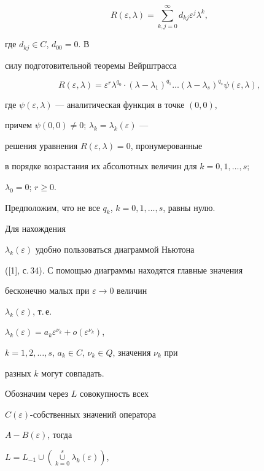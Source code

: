 $$


R(\varepsilon, \lambda )=\sum_{k,j=0}^\infty


d_{kj}\varepsilon^j\lambda^k,


$$


где $d_{kj}\in C$, $d_{00}=0$. В


силу подготовительной теоремы Вейрштрасса


$$


R(\varepsilon,\lambda)=\varepsilon^r\lambda^{q_0}\cdot


(\lambda-\lambda_1)^{q_1} \dotsc


(\lambda-\lambda_s)^{q_s}\psi(\varepsilon,\lambda),


$$


где $\psi(\varepsilon,\lambda)$ --- аналитическая функция в точке $(0,0)$,


причем $\psi(0,0)\ne 0$; $\lambda_k=\lambda_k(\varepsilon)$ ---


решения уравнения $R(\varepsilon,\lambda)=0$, пронумерованные


в порядке возрастания их абсолютных величин для $k=0,1,\dotsc, s$;


$\lambda_0=0$; $ r\ge 0$.





Предположим, что не все $q_k$, $k=0,1,\dotsc, s$, равны нулю.


Для нахождения


$\lambda_k(\varepsilon)$ удобно пользоваться диаграммой Ньютона


([1], с.\,34). С помощью диаграммы находятся главные значения


бесконечно малых при $\varepsilon\to 0$ величин


$\lambda_k(\varepsilon)$, т.\,е.


$\lambda_k(\varepsilon)=a_k\varepsilon^{\nu_k}+o(\varepsilon^{\nu_k})$,


$k=1,2,\dotsc, s$, $a_k\in C$, $\nu_k\in Q$, значения $\nu_k$ при


разных $k$ могут совпадать.





Обозначим через $L$ совокупность всех


$C(\varepsilon)$-собственных значений оператора


$A-B(\varepsilon)$, тогда


$L=L_{-1}\cup(\mathop{\cup}\limits_{k=0}^s{{\lambda_k(\varepsilon)}})$,


